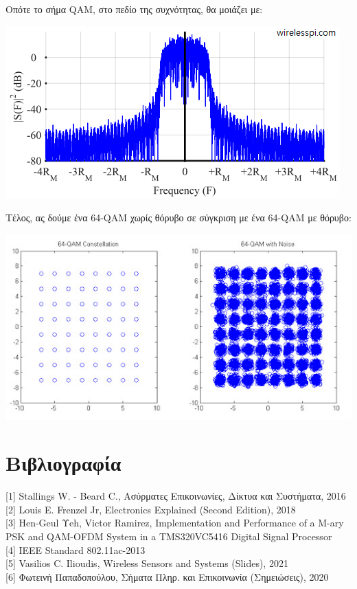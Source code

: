 \documentclass{article}
\begin{document}
Οπότε το σήμα QAM, στο πεδίο της συχνότητας, θα μοιάζει με: 
\begin{center}
    \includegraphics[scale=1]{papado4.png}
\end{center}
Τέλος, ας δούμε ένα 64-QAM χωρίς θόρυβο σε σύγκριση με ένα 64-QAM με θόρυβο:
\begin{center}
    \includegraphics[scale=0.6]{noise_aaaaa.jpg}
\end{center}
\section{Βιβλιογραφία}
\small
[1] Stallings W. - Beard C., Ασύρματες Επικοινωνίες, Δίκτυα και Συστήματα, 2016\\[0pt]
[2] Louis E. Frenzel Jr, Electronics Explained (Second Edition), 2018\\[0pt]
[3] Hen-Geul Υeh, Victor Ramirez, Implementation and Performance of a M-ary PSK and QAM-OFDM System in a TMS320VC5416 Digital Signal Processor\\[0pt]
[4] IEEE Standard 802.11ac-2013\\[0pt]
[5] Vasilios C. Ilioudis, Wireless Sensors and Systems (Slides), 2021\\[0pt]
[6] Φωτεινή Παπαδοπούλου, Σήματα Πληρ. και Επικοινωνία (Σημειώσεις), 2020
\end{document}
